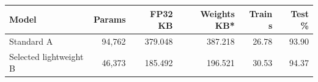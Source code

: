 \begin{tabular}{lrrrrr}
\toprule
Model & Params & FP32 KB & Weights KB* & Train s & Test \% \\
\midrule
Standard A & 94,762 & 379.048 & 387.218 & 26.78 & 93.90 \\
Selected lightweight B & 46,373 & 185.492 & 196.521 & 30.53 & 94.37 \\
\bottomrule
\end{tabular}

